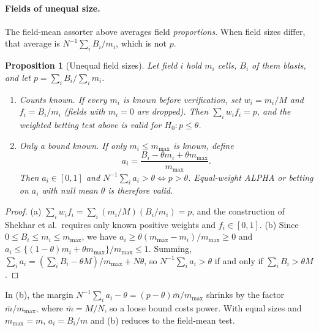 \documentclass[11pt]{article}
\newtheorem{proposition}{Proposition}
\theoremstyle{remark}
\theoremstyle{definition}
\begin{document}
\paragraph{Fields of unequal size.} The field-mean assorter above averages field \emph{proportions}. When field sizes differ, that average is $N^{-1}\sum_iB_i/m_i$, which is not $p$.

\begin{proposition}[Unequal field sizes]\label{prop:unequal}
Let field $i$ hold $m_i$ cells, $B_i$ of them blasts, and let $p=\sum_iB_i/\sum_im_i$.
\begin{enumerate}
\item[(a)] \emph{Counts known.} If every $m_i$ is known before verification, set $w_i=m_i/M$ and $f_i=B_i/m_i$ (fields with $m_i=0$ are dropped). Then $\sum_iw_if_i=p$, and the weighted betting test above is valid for $H_0:p\le\theta$.
\item[(b)] \emph{Only a bound known.} If only $m_i\le m_{\max}$ is known, define
\[
a_i=\frac{B_i-\theta m_i+\theta m_{\max}}{m_{\max}}.
\]
Then $a_i\in[0,1]$ and $N^{-1}\sum_ia_i>\theta\iff p>\theta$. Equal-weight ALPHA or betting on $a_i$ with null mean $\theta$ is therefore valid.
\end{enumerate}
\end{proposition}
\begin{proof}
(a) $\sum_iw_if_i=\sum_i(m_i/M)(B_i/m_i)=p$, and the construction of Shekhar et al.\ requires only known positive weights and $f_i\in[0,1]$.
(b) Since $0\le B_i\le m_i\le m_{\max}$, we have $a_i\ge\theta(m_{\max}-m_i)/m_{\max}\ge0$ and $a_i\le\{(1-\theta)m_i+\theta m_{\max}\}/m_{\max}\le1$. Summing, $\sum_ia_i=(\sum_iB_i-\theta M)/m_{\max}+N\theta$, so $N^{-1}\sum_ia_i>\theta$ if and only if $\sum_iB_i>\theta M$.
\end{proof}

In (b), the margin $N^{-1}\sum_ia_i-\theta=(p-\theta)\bar m/m_{\max}$ shrinks by the factor $\bar m/m_{\max}$, where $\bar m=M/N$, so a loose bound costs power. With equal sizes and $m_{\max}=m$, $a_i=B_i/m$ and (b) reduces to the field-mean test.
\end{document}
